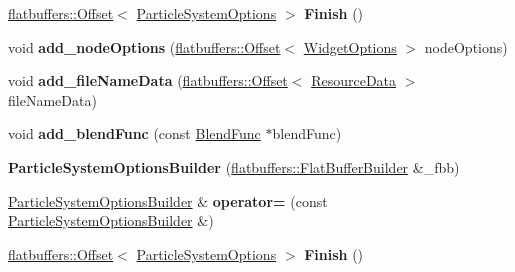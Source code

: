 \begin{DoxyCompactItemize}
\hyperlink{structflatbuffers_1_1Offset}{flatbuffers\+::\+Offset}$<$ \hyperlink{structflatbuffers_1_1ParticleSystemOptions}{Particle\+System\+Options} $>$ {\bfseries Finish} ()
\item 
\mbox{\label{structflatbuffers_1_1ParticleSystemOptionsBuilder_ac6cf88ac4c9ddc6a2380102a50404de7}} 
void {\bfseries add\+\_\+node\+Options} (\hyperlink{structflatbuffers_1_1Offset}{flatbuffers\+::\+Offset}$<$ \hyperlink{structflatbuffers_1_1WidgetOptions}{Widget\+Options} $>$ node\+Options)
\item 
\mbox{\label{structflatbuffers_1_1ParticleSystemOptionsBuilder_aaf10b47214ee9e47f8290c4d8f3436ea}} 
void {\bfseries add\+\_\+file\+Name\+Data} (\hyperlink{structflatbuffers_1_1Offset}{flatbuffers\+::\+Offset}$<$ \hyperlink{structflatbuffers_1_1ResourceData}{Resource\+Data} $>$ file\+Name\+Data)
\item 
\mbox{\label{structflatbuffers_1_1ParticleSystemOptionsBuilder_a0b2098f3918f5171a4a7c8eddfd0e61c}} 
void {\bfseries add\+\_\+blend\+Func} (const \hyperlink{structBlendFunc}{Blend\+Func} $\ast$blend\+Func)
\item 
\mbox{\label{structflatbuffers_1_1ParticleSystemOptionsBuilder_a8a0ee935d4cfd31c64e21838d5a989fe}} 
{\bfseries Particle\+System\+Options\+Builder} (\hyperlink{classflatbuffers_1_1FlatBufferBuilder}{flatbuffers\+::\+Flat\+Buffer\+Builder} \&\+\_\+fbb)
\item 
\mbox{\label{structflatbuffers_1_1ParticleSystemOptionsBuilder_a5b8090db41c01faef6117a0d92e031b0}} 
\hyperlink{structflatbuffers_1_1ParticleSystemOptionsBuilder}{Particle\+System\+Options\+Builder} \& {\bfseries operator=} (const \hyperlink{structflatbuffers_1_1ParticleSystemOptionsBuilder}{Particle\+System\+Options\+Builder} \&)
\item 
\mbox{\label{structflatbuffers_1_1ParticleSystemOptionsBuilder_ad3ca7e9ff2e8e2e558508bd36d56a2bb}} 
\hyperlink{structflatbuffers_1_1Offset}{flatbuffers\+::\+Offset}$<$ \hyperlink{structflatbuffers_1_1ParticleSystemOptions}{Particle\+System\+Options} $>$ {\bfseries Finish} ()
\end{DoxyCompactItemize}
